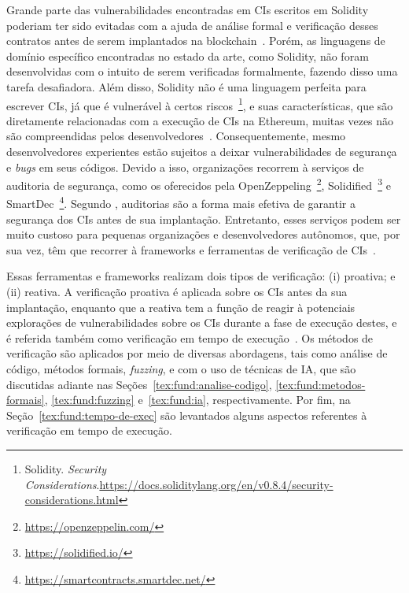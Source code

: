 Grande parte das vulnerabilidades encontradas em CIs escritos em Solidity poderiam ter sido evitadas com a ajuda de análise formal e verificação desses contratos antes de serem implantados na blockchain~\cite{singh2020survey-vulnerabilities-elsevier, chen2020survey-ethereum-acm}. Porém, as linguagens de domínio específico encontradas no estado da arte, como Solidity, não foram desenvolvidas com o intuito de serem verificadas formalmente, fazendo disso uma tarefa desafiadora. Além disso, Solidity não é uma linguagem perfeita para escrever CIs, já que é vulnerável à certos riscos~\footnote{Solidity. \textit{Security Considerations}.\url{https://docs.soliditylang.org/en/v0.8.4/security-considerations.html}}, e suas características, que são diretamente relacionadas com a execução de CIs na Ethereum, muitas vezes não são compreendidas pelos desenvolvedores~\cite{singh2020survey-vulnerabilities-elsevier, atzei2017survey-attacks-sok}. Consequentemente, mesmo desenvolvedores experientes estão sujeitos a deixar vulnerabilidades de segurança e \textit{bugs} em seus códigos. Devido a isso, organizações recorrem à serviços de auditoria de segurança, como os oferecidos pela OpenZeppeling~\footnote{\url{https://openzeppelin.com/}}, Solidified~\footnote{\url{https://solidified.io/}} e SmartDec~\footnote{\url{https://smartcontracts.smartdec.net/}}. Segundo , auditorias são a forma mais efetiva de garantir a segurança dos CIs antes de sua implantação. Entretanto, esses serviços podem ser muito custoso para pequenas organizações e desenvolvedores autônomos, que, por sua vez, têm que recorrer à frameworks e ferramentas de verificação de CIs~\cite{singh2020survey-vulnerabilities-elsevier}.

Essas ferramentas e frameworks realizam dois tipos de verificação: (i) proativa; e (ii) reativa. A verificação proativa é aplicada sobre os CIs antes da sua implantação, enquanto que a reativa tem a função de reagir à potenciais explorações de vulnerabilidades sobre os CIs durante a fase de execução destes, e é referida também como verificação em tempo de execução~\cite{chen2020survey-ethereum-acm}. Os métodos de verificação são aplicados por meio de diversas abordagens, tais como análise de código, métodos formais, \textit{fuzzing}, e com o uso de técnicas de IA, que são discutidas adiante nas Seções~\ref{tex:fund:analise-codigo}, \ref{tex:fund:metodos-formais}, \ref{tex:fund:fuzzing} e~\ref{tex:fund:ia}, respectivamente. Por fim, na Seção~\ref{tex:fund:tempo-de-exec} são levantados alguns aspectos referentes à verificação em tempo de execução.

